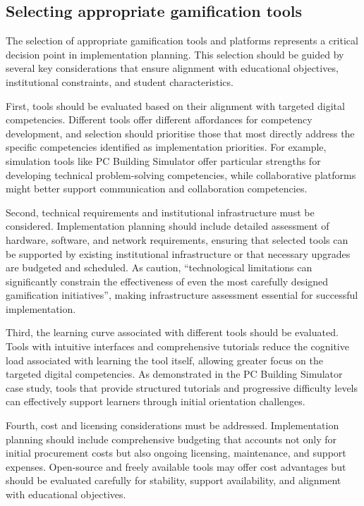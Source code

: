 \documentclass[cte]{acnsart}
\begin{document}
\subsection{Selecting appropriate gamification tools}

The selection of appropriate gamification tools and platforms represents a critical decision point in implementation planning. This selection should be guided by several key considerations that ensure alignment with educational objectives, institutional constraints, and student characteristics.

First, tools should be evaluated based on their alignment with targeted digital competencies. Different tools offer different affordances for competency development, and selection should prioritise those that most directly address the specific competencies identified as implementation priorities. For example, simulation tools like PC Building Simulator offer particular strengths for developing technical problem-solving competencies, while collaborative platforms might better support communication and collaboration competencies.

Second, technical requirements and institutional infrastructure must be considered. Implementation planning should include detailed assessment of hardware, software, and network requirements, ensuring that selected tools can be supported by existing institutional infrastructure or that necessary upgrades are budgeted and scheduled. As \citet{Alhumairi202422} caution, ``technological limitations can significantly constrain the effectiveness of even the most carefully designed gamification initiatives'', making infrastructure assessment essential for successful implementation.

Third, the learning curve associated with different tools should be evaluated. Tools with intuitive interfaces and comprehensive tutorials reduce the cognitive load associated with learning the tool itself, allowing greater focus on the targeted digital competencies. As demonstrated in the PC Building Simulator case study, tools that provide structured tutorials and progressive difficulty levels can effectively support learners through initial orientation challenges.

Fourth, cost and licensing considerations must be addressed. Implementation planning should include comprehensive budgeting that accounts not only for initial procurement costs but also ongoing licensing, maintenance, and support expenses. Open-source and freely available tools may offer cost advantages but should be evaluated carefully for stability, support availability, and alignment with educational objectives.
\end{document}
